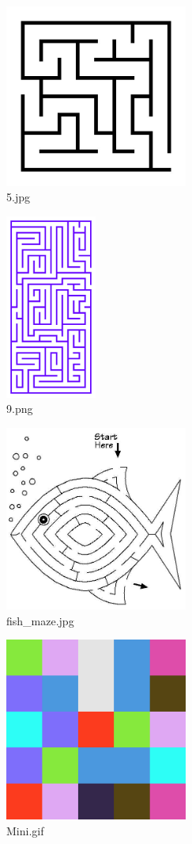 \documentclass[titlepage]{article}
\begin{document}
\begin{figure}[H]
  \centering
  \includegraphics[width=6cm]{5.jpg}
  \caption{5.jpg}
  \label{fig:dijk}
\end{figure}

\begin{figure}[H]
  \centering
  \includegraphics[width=3cm]{9.png}
  \caption{9.png}
  \label{fig:dijk}
\end{figure}

\begin{figure}[H]
  \centering
  \includegraphics[width=6cm]{fishmaze.jpg}
  \caption{fish\_maze.jpg}
  \label{fig:dijk}
\end{figure}

\begin{figure}[H]
  \centering
  \includegraphics[width=6cm]{mini.png}
  \caption{Mini.gif}
  \label{fig:dijk}
\end{figure}
\end{document}
